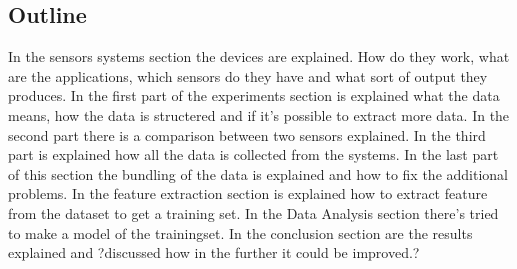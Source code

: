 	\subsection{Outline}
		In the sensors systems section the devices are explained. How do they work, what are the applications, which sensors do they have and what sort of output they produces. In the first part of the experiments section is explained what the data means, how the data is structered and if it's possible to extract more data. In the second part there is a comparison between two sensors explained. In the third part is explained how all the data is collected from the systems. In the last part of this section the bundling of the data is explained and how to fix the additional problems. In the feature extraction section is explained how to extract feature from the dataset to get a training set. In the Data Analysis section there's tried to make a model of the trainingset. In the conclusion section are the results explained and ?discussed how in the further it could be improved.?
	
	\iffalse
		Klad		


		It's important to explain which systems are being used, what the data means and how the data looks like. Next section there is a comparison between the two physiological devices, what was really useful to learn the devices. The data collection is the most important part of the thesis, because it's explaining how everything was set up and done to get the provided dataset. - Modeling - Conclusions 

		In the Sensor System section the hardware is explained, what the sensors does, what the applications are and how it works. 
		In the experiments section describes useful derivative data, a comparison between the two physiological devices and the experiment to combine all three devices to a good dataset.
		Modeling: I made a dataset of 15 days with all kind of features. Set the deep sleep as target attribute and use WeKa to make a model, with a discussion why deep sleep as target, how the algorithm works and hopefully some insights of the model. 
	\fi
